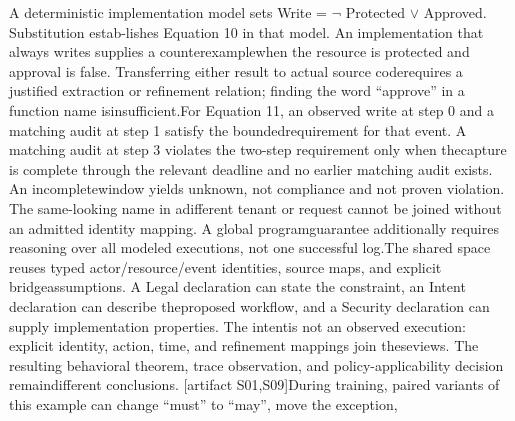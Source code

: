 

\noindent
A deterministic implementation model sets Write = \ensuremath{\neg} Protected \ensuremath{\lor} Approved. Substitution estab-\linebreak[4]
lishes Equation 10 in that model. An implementation that always writes supplies a counterexample\linebreak[4]
when the resource is protected and approval is false. Transferring either result to actual source code\linebreak[4]
requires a justified extraction or refinement relation; finding the word ``approve'' in a function name is\linebreak[4]
insufficient.\linebreak[4]
For Equation 11, an observed write at step 0 and a matching audit at step 1 satisfy the bounded\linebreak[4]
requirement for that event. A matching audit at step 3 violates the two-step requirement only when the\linebreak[4]
capture is complete through the relevant deadline and no earlier matching audit exists. An incomplete\linebreak[4]
window yields unknown, not compliance and not proven violation. The same-looking name in a\linebreak[4]
different tenant or request cannot be joined without an admitted identity mapping. A global program\linebreak[4]
guarantee additionally requires reasoning over all modeled executions, not one successful log.\linebreak[4]
The shared space reuses typed actor/resource/event identities, source maps, and explicit bridge\linebreak[4]
assumptions. A Legal declaration can state the constraint, an Intent declaration can describe the\linebreak[4]
proposed workflow, and a Security declaration can supply implementation properties. The intent\linebreak[4]
is not an observed execution: explicit identity, action, time, and refinement mappings join these\linebreak[4]
views. The resulting behavioral theorem, trace observation, and policy-applicability decision remain\linebreak[4]
different conclusions. [artifact S01,S09]\linebreak[4]
During training, paired variants of this example can change ``must'' to ``may'', move the exception,\linebreak[4]
